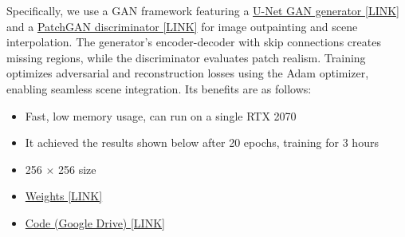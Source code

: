\documentclass[sigconf]{acmart}
\begin{document}
Specifically, we use a GAN framework featuring a \href{https://paperswithcode.com/method/u-net-gan}{U-Net GAN generator [LINK]} and a \href{https://paperswithcode.com/method/patchgan}{PatchGAN discriminator [LINK]} for image outpainting and scene interpolation. The generator’s encoder-decoder with skip connections creates missing regions, while the discriminator evaluates patch realism. Training optimizes adversarial and reconstruction losses using the Adam optimizer, enabling seamless scene integration. Its benefits are as follows:
\begin{itemize}
    \item Fast, low memory usage, can run on a single RTX 2070
    \item It achieved the results shown below after 20 epochs, training for 3 hours
    \item 256 $\times$ 256 size
    \item \href{https://drive.google.com/file/d/1EORJGbg-rMQ_FNpzz7OSG73Vluro0Lxl/view?usp=sharing}{Weights [LINK]}
    \item \href{https://drive.google.com/drive/u/2/folders/1wOD_tgj9k3gUZI9hBL-WtKDS-uvz9m5S}{Code (Google Drive) [LINK]}
\end{itemize}
\end{document}
